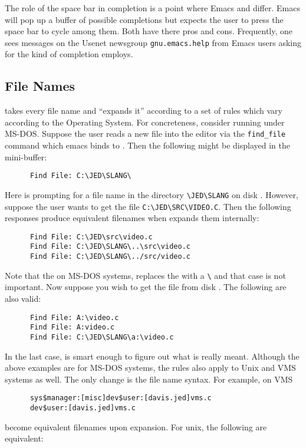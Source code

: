   The role of the space bar in completion is a point where Emacs and \jed{}
  differ. Emacs will pop up a buffer of possible completions but \jed{} expects
  the user to press the space bar to cycle among them.  Both have there pros
  and cons.  Frequently, one sees messages on the Usenet newsgroup
  \verb|gnu.emacs.help| from Emacs users asking for the kind of completion
  \jed{} employs.

\subsection{File Names}

  \jed{} takes every file name and ``expands it'' according to a set of rules
  which vary according to the Operating System.  For concreteness, consider
  \jed{} running under MS-DOS.  Suppose the user reads a new file into the
  editor via the \verb|find_file| command which emacs binds to 
  . Then the following might be displayed in the mini-buffer:

\begin{verbatim}
      Find File: C:\JED\SLANG\
\end{verbatim}


  Here \jed{} is prompting for a file name in the directory \verb|\JED\SLANG|
  on disk \var{C:}. However, suppose the user wants to get the file
  \verb|C:\JED\SRC\VIDEO.C|. Then the following responses produce equivalent
  filenames when \jed{} expands them internally:
\begin{verbatim}
      Find File: C:\JED\src\video.c
      Find File: C:\JED\SLANG\..\src\video.c
      Find File: C:\JED\SLANG\../src/video.c
\end{verbatim}

  Note that the on MS-DOS systems, \jed{} replaces the \var{/} with a \verb|\|
  and that case is not important.  Now suppose you wish to get the file
  \var{VIDEO.C} from disk \var{A:}.  The following are also valid:

\begin{verbatim}
      Find File: A:\video.c
      Find File: A:video.c
      Find File: C:\JED\SLANG\a:\video.c
\end{verbatim}

  In the last case, \jed{} is smart enough to figure out what is really meant.
  Although the above examples are for MS-DOS systems, the rules also apply to
  Unix and VMS systems as well.  The only change is the file name syntax.
  For example, on VMS
\begin{verbatim}
      sys$manager:[misc]dev$user:[davis.jed]vms.c
      dev$user:[davis.jed]vms.c
\end{verbatim}
  become equivalent filenames upon expansion.  For unix, the following are
  equivalent:

